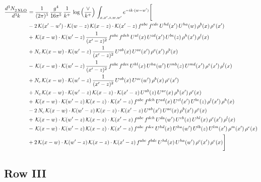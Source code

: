 \documentclass[9pt]{article}
\numberwithin{equation}{section}
\begin{document}
\begin{align}
    \frac{d^{3}N_{2\,\rm NLO}^{\rm}}{d^{3}k}  & = \frac{1}{(2\pi)^{3}}\,\frac{g^{4}}{16\pi^{5}}\,\frac{1}{k^{+}}\,\log{\left(\frac{\vee}{k^{+}}\right)}\, \int_{x,x',z,w,w'}e^{-ik\cdot (w-w')}\Bigg[\notag\\ & -2\,\mathcal{K}(x'-w')\cdot\mathcal{K}(w-z)\,\mathcal{K}(x-z)\cdot\mathcal{K}(x'-z)\,f^{abc}\,f^{cde}\,U^{hd}(x')\,U^{ha}(w)\,\rho^{b}(x)\,\rho^{e}(x')\notag \\ 
&+\,\mathcal{K}(x-w)\cdot\mathcal{K}(w'-z)\,\frac{1}{(x'-z)^{2}}\,f^{abc}\,f^{deh}\,U^{al}(x)\,U^{cd}(x')\,U^{be}(z)\,\rho^{h}(x')\,\rho^{l}(x)\notag \\ 
&+N_{c}\,\mathcal{K}(x-w)\cdot\mathcal{K}(w'-z)\,\frac{1}{(x'-z)^{2}}\,U^{ab}(x)\,U^{ac}(x')\,\rho^{c}(x')\,\rho^{b}(x)\notag \\ 
&-\,\mathcal{K}(x-w)\cdot\mathcal{K}(w'-z)\,\frac{1}{(x'-z)^{2}}\,f^{abc}\,f^{dce}\,U^{hl}(x)\,U^{ha}(w')\,U^{mb}(z)\,U^{md}(x')\,\rho^{e}(x')\,\rho^{l}(x)\notag \\ & +N_{c}\,\mathcal{K}(x-w)\cdot\mathcal{K}(w'-z)\,\frac{1}{(x'-z)^{2}}\,U^{ab}(x)\,U^{ac}(w')\,\rho^{b}(x)\,\rho^{c}(x')\notag \\ 
&+N_{c}\,\mathcal{K}(x-w)\cdot\mathcal{K}(w'-z)\,\mathcal{K}(x-z)\cdot\mathcal{K}(x'-z)\,U^{ab}(z)\,U^{ac}(x)\,\rho^{b}(x')\,\rho^{c}(x)\notag \\ 
&+\,\mathcal{K}(x-w)\cdot\mathcal{K}(w'-z)\,\mathcal{K}(x-z)\cdot\mathcal{K}(x'-z)\,f^{abc}\,f^{deh}\,U^{ad}(x)\,U^{cl}(x')\,U^{be}(z)\,\rho^{l}(x')\,\rho^{h}(x)\notag \\ 
&-2\,N_{c}\,\mathcal{K}(x-w)\cdot\mathcal{K}(w'-z)\,\mathcal{K}(x-z)\cdot\mathcal{K}(x'-z)\,U^{ab}(x')\,U^{ac}(x)\,\rho^{b}(x')\,\rho^{c}(x)\notag \\ 
&+\,\mathcal{K}(x-w)\cdot\mathcal{K}(w'-z)\,\mathcal{K}(x-z)\cdot\mathcal{K}(x'-z)\,f^{abc}\,f^{deh}\,U^{da}(w')\,U^{eb}(z)\,U^{hl}(x)\,\rho^{c}(x')\,\rho^{l}(x)\notag \\ 
&-\,\mathcal{K}(x-w)\cdot\mathcal{K}(w'-z)\,\mathcal{K}(x-z)\cdot\mathcal{K}(x'-z)\,f^{abc}\,f^{dce}\,U^{hd}(x)\,U^{ha}(w')\,U^{lb}(z)\,U^{lm}(x')\,\rho^{m}(x')\,\rho^{e}(x)\notag \\ 
&+2\,\mathcal{K}(x-w)\cdot\mathcal{K}(w'-z)\,\mathcal{K}(x-z)\cdot\mathcal{K}(x'-z)\,f^{abc}\,f^{bde}\,U^{hd}(x)\,U^{ha}(w')\,\rho^{c}(x')\,\rho^{e}(x)\Bigg]
\end{align}
\subsection{Row III}
\end{document}
